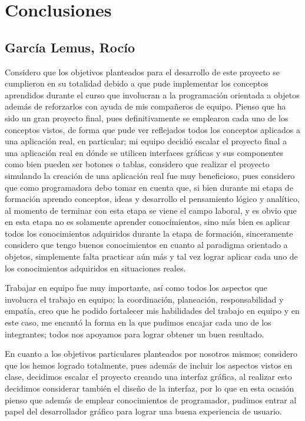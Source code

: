 \section*{Conclusiones}

\subsection*{García Lemus, Rocío}
Considero que los objetivos planteados para el desarrollo de este proyecto se cumplieron 
en su totalidad debido a que pude implementar los conceptos aprendidos durante el curso que 
involucran a la programación orientada a objetos además de reforzarlos con ayuda de mis 
compañeros de equipo. Pienso que ha sido un gran proyecto final, pues definitivamente 
se emplearon cada uno de los conceptos vistos, de forma que pude ver reflejados
todos los conceptos aplicados a una aplicación real, en particular; mi equipo decidió escalar el 
proyecto final a una aplicación real en dónde se utilicen interfaces gráficas y sus componentes 
como bien pueden ser botones o tablas, considero que realizar el proyecto simulando la creación 
de una aplicación real fue muy beneficioso, pues considero que como programadora debo tomar en 
cuenta que, si bien durante mi etapa de formación aprendo conceptos, ideas y desarrollo el 
pensamiento lógico y analítico, al momento de terminar con esta etapa se viene el campo laboral, 
y es obvio que en esta etapa no es solamente aprender conocimientos, sino más bien es aplicar 
todos los conocimientos adquiridos durante la etapa de formación, sinceramente considero que 
tengo buenos conocimientos en cuanto al paradigma orientado a objetos, simplemente falta 
practicar aún más y tal vez lograr aplicar cada uno de los conocimientos adquiridos en 
situaciones reales. 


Trabajar en equipo fue muy importante, así como todos los aspectos que involucra el trabajo 
en equipo; la coordinación, planeación, responsabilidad y empatía, creo que he podido fortalecer 
mis habilidades del trabajo en equipo y en este caso, me encantó la forma en la que pudimos 
encajar cada uno de los integrantes; todos nos apoyamos para lograr obtener un buen resultado. 

En cuanto a los objetivos particulares planteados por nosotros mismos; considero que los hemos 
logrado totalmente, pues además de incluir los aspectos vistos en clase, decidimos escalar el 
proyecto creando una interfaz gráfica, al realizar esto decidimos considerar también el diseño de la 
interfaz, por lo que en esta ocasión pienso que además de emplear conocimientos de 
programador, pudimos entrar al papel del desarrollador gráfico para lograr una buena 
experiencia de usuario. 

